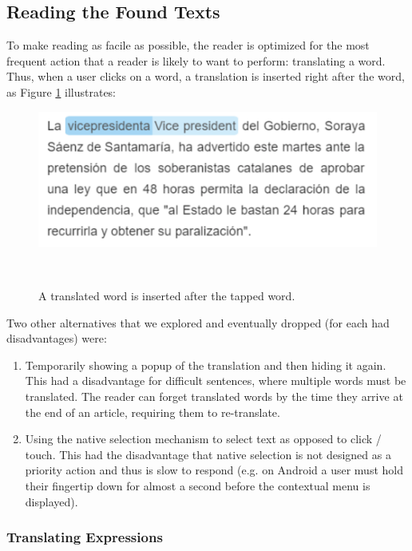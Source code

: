 \subsection{Reading the Found Texts}

To make reading as facile as possible, the reader is optimized for the most frequent action that a reader is likely to want to perform: translating a word. Thus, when a user clicks on a word, a translation is inserted right after the word, as Figure \ref{fig:translated_word} illustrates: 

\begin{figure}[h!]
\centering
  \includegraphics[width=0.8\columnwidth]{figures/translated_word}
  \caption{A translated word is inserted after the tapped word.}~\label{fig:translated_word}
\end{figure}

Two other alternatives that we explored and eventually dropped (for each had disadvantages) were: 

\begin{enumerate}

  \item Temporarily showing a popup of the translation and then hiding it again. This had a disadvantage for difficult sentences, where multiple words must be translated. The reader can forget translated words by the time they arrive at the end of an article, requiring them to re-translate.
  \item Using the native selection mechanism to select text as opposed to click / touch. 
  This had the disadvantage that native selection is not designed as a priority action and thus is slow to respond (e.g. on Android a user must hold their fingertip down for almost a second before the contextual menu is displayed). 
\end{enumerate}


\subsubsection{Translating Expressions}

